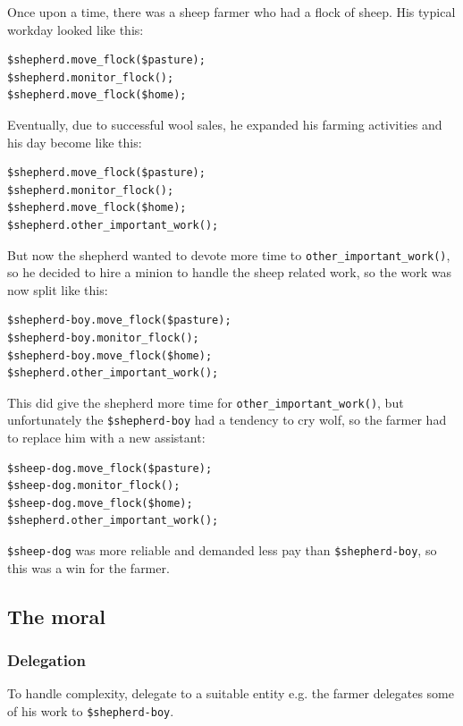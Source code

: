 Once upon a time, there was a sheep farmer who had a 
flock of sheep. His typical workday looked like this:

\begin{verbatim}
$shepherd.move_flock($pasture);
$shepherd.monitor_flock();
$shepherd.move_flock($home);
\end{verbatim}

Eventually, due to successful wool sales, he expanded 
his farming activities and his day become like this:

\begin{verbatim}
$shepherd.move_flock($pasture);
$shepherd.monitor_flock();
$shepherd.move_flock($home);
$shepherd.other_important_work();
\end{verbatim}

But now the shepherd wanted to devote more time to 
\verb'other_important_work()', so he decided to hire 
a minion to handle the sheep related work, so the 
work was now split like this:

\begin{verbatim}
$shepherd-boy.move_flock($pasture);
$shepherd-boy.monitor_flock();
$shepherd-boy.move_flock($home);
$shepherd.other_important_work();
\end{verbatim}

This did give the shepherd more time for 
\verb'other_important_work()', but unfortunately the 
\verb'$shepherd-boy' had a tendency to cry wolf, so 
the farmer had to replace him with a new assistant:

\begin{verbatim}
$sheep-dog.move_flock($pasture);
$sheep-dog.monitor_flock();
$sheep-dog.move_flock($home);
$shepherd.other_important_work();
\end{verbatim}

\verb'$sheep-dog' was more reliable and demanded 
less pay than \verb'$shepherd-boy', so this was 
a win for the farmer.

\subsection{The moral}

\subsubsection{Delegation}

To handle complexity, delegate to a suitable 
entity e.g. the farmer delegates some of his 
work to \verb'$shepherd-boy'.

